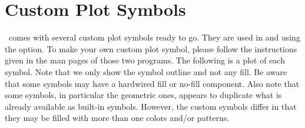 %
%
\chapter{Custom Plot Symbols}
\label{app:N}
\thispagestyle{headings}

\GMT\ comes with several custom plot symbols ready to go.  They are used in 
and  using the  option.  To make your own custom plot symbol,
please follow the instructions given in the man pages of those two programs.  The following is
a plot of each symbol.  Note that we only show the symbol outline and not any fill.
Be aware that some symbols may have a hardwired fill or no-fill component. Also
note that some symbols, in particular the geometric ones, appears to duplicate what
is already available as built-in symbols.  However, the custom symbols differ in
that they may be filled with more than one colors and/or patterns. \\ 




